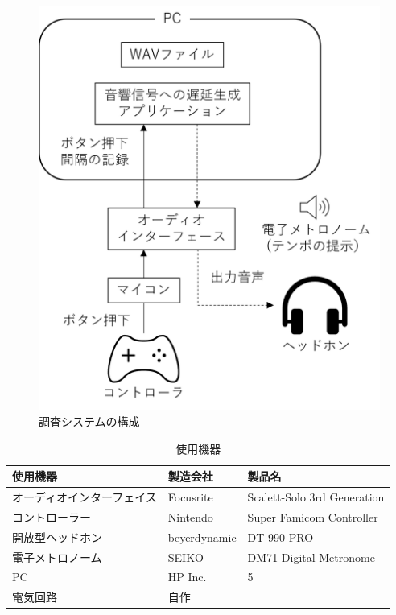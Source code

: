\begin{figure}[tb]
  \centering
  \includegraphics[scale=0.8]{figures/system_button_click.png}
  \caption{調査システムの構成}
\end{figure}
\begin{table}[tbp]
  \caption{使用機器}
  \label{table:device}
  \centering
  \begin{tabular}{lll}
    \hline
    使用機器 & 製造会社 & 製品名\\
    \hline \hline
    オーディオインターフェイス & Focusrite & Scalett-Solo 3rd Generation\\
    コントローラー  & Nintendo & Super Famicom Controller\\
    開放型ヘッドホン & beyerdynamic & DT 990 PRO\\
    電子メトロノーム  & SEIKO  & DM71 Digital Metronome \\
    PC  & HP Inc. & 5 \\
    電気回路 & 自作 & 
\\
    \hline
  \end{tabular}
\end{table}

